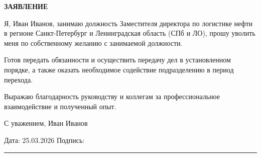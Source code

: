 \documentclass[12pt]{article}
\begin{document}
\begin{center}
\textbf{\LARGE ЗАЯВЛЕНИЕ}
\end{center}

\vspace{1cm}



Я, Иван Иванов, занимаю должность Заместителя директора по логистике нефти в регионе Санкт-Петербург и Ленинградская область (СПб и ЛО), прошу уволить меня по собственному желанию с занимаемой должности.

Готов передать обязанности и осуществить передачу дел в установленном порядке, а также оказать необходимое содействие подразделению в период перехода.

Выражаю благодарность руководству и коллегам за профессиональное взаимодействие и полученный опыт.

С уважением,
Иван Иванов



\vfill

\noindent
Дата: 25.03.2026 \hfill Подпись: \rule{5cm}{0.4pt}
\end{document}
